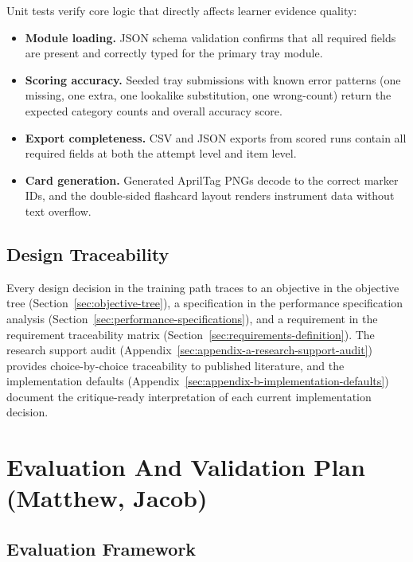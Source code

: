 \documentclass[10pt,a4paper]{article}
\begin{document}
Unit tests verify core logic that directly affects learner evidence quality:

\begin{itemize}
  \item \textbf{Module loading.} JSON schema validation confirms that all required
  fields are present and correctly typed for the primary tray module.
  \item \textbf{Scoring accuracy.} Seeded tray submissions with known error patterns
  (one missing, one extra, one lookalike substitution, one wrong-count) return
  the expected category counts and overall accuracy score.
  \item \textbf{Export completeness.} CSV and JSON exports from scored runs contain
  all required fields at both the attempt level and item level.
  \item \textbf{Card generation.} Generated AprilTag PNGs decode to the correct
  marker IDs, and the double-sided flashcard layout renders instrument data
  without text overflow.
\end{itemize}

\subsection{Design Traceability}
\label{sec:design-traceability}

Every design decision in the training path traces to an objective in the
objective tree (Section~\ref{sec:objective-tree}), a specification in
the performance specification analysis
(Section~\ref{sec:performance-specifications}), and a requirement in
the requirement traceability matrix
(Section~\ref{sec:requirements-definition}). The research support audit
(Appendix~\ref{sec:appendix-a-research-support-audit}) provides
choice-by-choice traceability to published literature, and the implementation
defaults (Appendix~\ref{sec:appendix-b-implementation-defaults}) document the
critique-ready interpretation of each current implementation decision.




\section{Evaluation And Validation Plan \hfill {\normalfont\small (Matthew, Jacob)}}
\label{sec:evaluation-and-validation-plan}
\subsection{Evaluation Framework}
\end{document}
